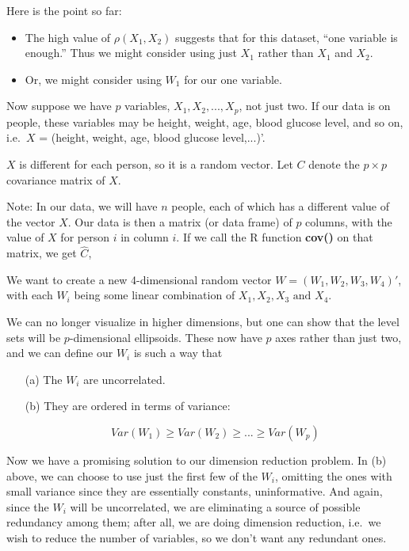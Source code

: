 Here is the point so far:

\begin{itemize}

\item The high value of $\rho(X_1,X_2)$ suggests that for this dataset,
``one variable is enough.''  Thus we might consider using just $X_1$
rather than $X_1$ and $X_2$.

\item Or, we might consider using $W_1$ for our one
variable.  

\end{itemize} 

Now suppose we have $p$ variables, $X_1,
X_2,...,X_p$, not just two.  If our data is on people, these variables
may be height, weight, age, blood glucose level, and so on, i.e.\    
$X$ = (height, weight, age, blood glucose level,...)'.  

$X$ is different for each person, so it is a random vector.  Let $C$
denote the $p \times p$ covariance matrix of $X$.

Note:  In our data, we will have $n$ people, each of which has a
different value of the vector $X$.  Our data is then a matrix (or data
frame) of $p$ columns, with the value of $X$ for person $i$ in column
$i$.  If we call the R function \textbf{cov()} on that matrix, we get
$\widehat{C}$, 

We want to create a new 4-dimensional random vector $W =
(W_1,W_2,W_3,W_4)'$, with each $W_i$ being some linear combination of
$X_1, X_2, X_3 \textrm{ and } X_4$.

We can no longer visualize in higher dimensions, but one can show that
the level sets will be $p$-dimensional ellipsoids.  These now have $p$
axes rather than just two, and we can define our $W_i$ is such a way
that 

\begin{itemize}

\item [(a)] The $W_i$ are uncorrelated.

\item [(b)] They are ordered in terms of variance:

\begin{equation}
Var(W_1) \geq Var(W_2) \geq ... \geq Var(W_p)
\end{equation}

\end{itemize} 

Now we have a promising solution to our dimension reduction problem.  In
(b) above, we can choose to use just the first few of the $W_i$,
omitting the ones with small variance since they are essentially
constants, uninformative.  And again, since the $W_i$ will be
uncorrelated, we are eliminating a source of possible redundancy among
them; after all, we are doing dimension reduction, i.e.\ we wish to
reduce the number of variables, so we don't want any redundant ones.

